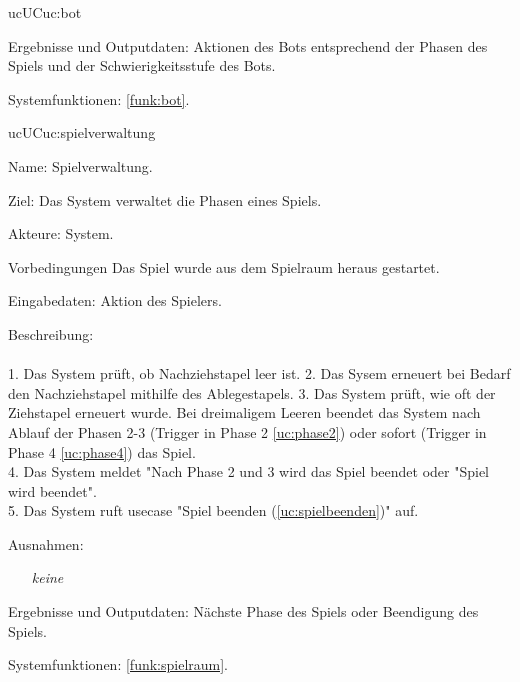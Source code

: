 \begin{description}[leftmargin=5em, style=sameline]
\begin{lhp}{uc}{UC}{uc:bot}
\begin{itemize}
			\end{itemize}
		\item [Ergebnisse und Outputdaten:] Aktionen des Bots entsprechend der Phasen des Spiels und der Schwierigkeitsstufe des Bots.
		\item [Systemfunktionen:] \ref{funk:bot}.
	\end{lhp}


	\begin{lhp}{uc}{UC}{uc:spielverwaltung}
		\item [Name:] Spielverwaltung.
		\item [Ziel:] Das System verwaltet die Phasen eines Spiels.
		\item [Akteure:] System.
		\item [Vorbedingungen] Das Spiel wurde aus dem Spielraum heraus gestartet.
		\item [Eingabedaten:] Aktion des Spielers.
		\item [Beschreibung:] \hfill\\ \hfill\\
			1. Das System prüft, ob Nachziehstapel leer ist. 
			2. Das Sysem erneuert bei Bedarf den Nachziehstapel mithilfe des Ablegestapels.
			3. Das System prüft, wie oft der Ziehstapel erneuert wurde. Bei dreimaligem Leeren beendet das System nach Ablauf der Phasen 2-3 (Trigger in Phase 2 \ref{uc:phase2}) oder sofort (Trigger in Phase 4 \ref{uc:phase4}) das Spiel.\\
			4. Das System meldet "{}Nach Phase 2 und 3 wird das Spiel beendet oder "Spiel wird beendet{}"{}.\\
			5. Das System ruft usecase "{}Spiel beenden (\ref{uc:spielbeenden}){}" {} auf.\\
		\item [Ausnahmen:] \hfill
				\begin{itemize} 
					\item[] \textit{keine}
					
				\end{itemize}
		\item [Ergebnisse und Outputdaten:] Nächste Phase des Spiels oder Beendigung des Spiels.	
		\item [Systemfunktionen:] \ref{funk:spielraum}.
	\end{lhp}


\end{description}

